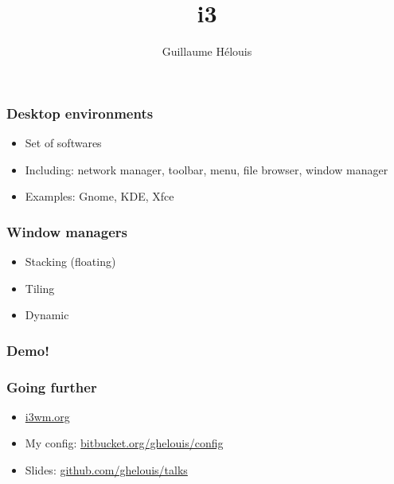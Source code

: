 \documentclass{beamer}
\title{i3}
\author{Guillaume Hélouis}
\begin{document}
\begin{frame}
  \titlepage
\end{frame}
\begin{frame} \frametitle{Desktop environments}
  \begin{itemize}
    \item Set of softwares
    \item Including: network manager, toolbar, menu, file browser, window
      manager 
    \item Examples: Gnome, KDE, Xfce
  \end{itemize}
\end{frame}
\begin{frame} \frametitle{Window managers}
  \begin{itemize}
    \item Stacking (floating)
    \item Tiling
    \item Dynamic
  \end{itemize}
\end{frame}
\begin{frame} \frametitle{Demo!}
\end{frame}
\begin{frame} \frametitle{Going further}
  \begin{itemize}
    \item \href{https://i3wm.org/}{i3wm.org}
  \end{itemize}
  \begin{itemize}
    \item My config: \href{https://bitbucket.org/ghelouis/config}{bitbucket.org/ghelouis/config}
    \item Slides: \href{https://github.com/ghelouis/talks}{github.com/ghelouis/talks}
  \end{itemize}
\end{frame}
\end{document}
